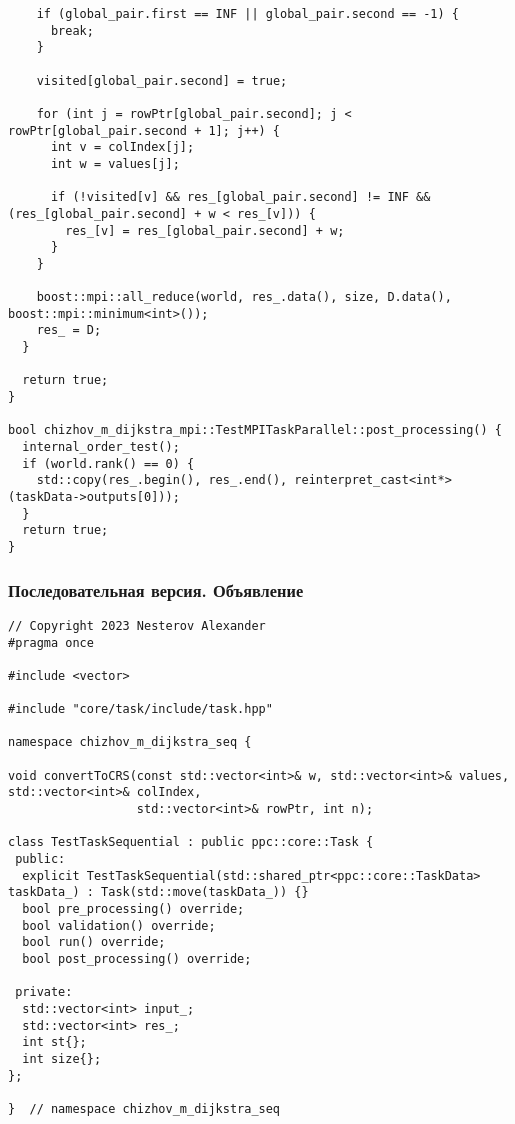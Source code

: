 \documentclass[a4paper, 14pt]{extarticle}
\begin{document}
\begin{lstlisting}
    if (global_pair.first == INF || global_pair.second == -1) {
      break;
    }

    visited[global_pair.second] = true;

    for (int j = rowPtr[global_pair.second]; j < rowPtr[global_pair.second + 1]; j++) {
      int v = colIndex[j];
      int w = values[j];

      if (!visited[v] && res_[global_pair.second] != INF && (res_[global_pair.second] + w < res_[v])) {
        res_[v] = res_[global_pair.second] + w;
      }
    }

    boost::mpi::all_reduce(world, res_.data(), size, D.data(), boost::mpi::minimum<int>());
    res_ = D;
  }

  return true;
}

bool chizhov_m_dijkstra_mpi::TestMPITaskParallel::post_processing() {
  internal_order_test();
  if (world.rank() == 0) {
    std::copy(res_.begin(), res_.end(), reinterpret_cast<int*>(taskData->outputs[0]));
  }
  return true;
}
\end{lstlisting}

\newpage
\subsubsection{Последовательная версия. Объявление}
\begin{lstlisting}
// Copyright 2023 Nesterov Alexander
#pragma once

#include <vector>

#include "core/task/include/task.hpp"

namespace chizhov_m_dijkstra_seq {

void convertToCRS(const std::vector<int>& w, std::vector<int>& values, std::vector<int>& colIndex,
                  std::vector<int>& rowPtr, int n);

class TestTaskSequential : public ppc::core::Task {
 public:
  explicit TestTaskSequential(std::shared_ptr<ppc::core::TaskData> taskData_) : Task(std::move(taskData_)) {}
  bool pre_processing() override;
  bool validation() override;
  bool run() override;
  bool post_processing() override;

 private:
  std::vector<int> input_;
  std::vector<int> res_;
  int st{};
  int size{};
};

}  // namespace chizhov_m_dijkstra_seq
\end{lstlisting}

\newpage
\end{document}
